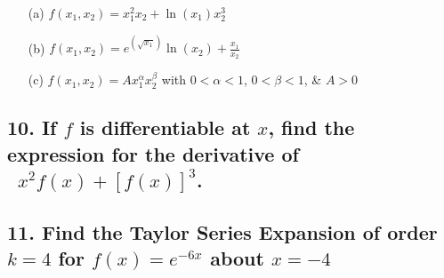 \documentclass{article}
\begin{document}
\begin{itemize}
    \item[(a)] \( f(x_1, x_2) = x_1^2 x_2 + \ln(x_1) x_2^3 \)
    \item[(b)] \( f(x_1, x_2) = e^{(\sqrt{x_1})} \ln(x_2) + \frac{x_1}{x_2} \)
    \item[(c)] \( f(x_1, x_2) = Ax_1^{\alpha}x_2^{\beta} \) with \( 0 < \alpha < 1 \), \( 0 < \beta < 1 \), \& \( A > 0 \)
\end{itemize}

\subsection*{10. If \( f \) is differentiable at \( x \), find the expression for the derivative of \\\ \( x^2 f(x) + [f(x)]^3 \).}

\subsection*{11. Find the Taylor Series Expansion of order \( k = 4 \) for \(f(x) = e^{-6x} \) about \( x = -4 \)}
\end{document}
